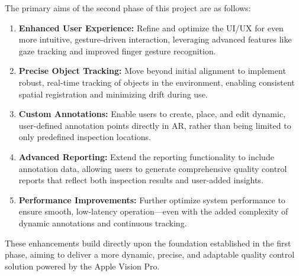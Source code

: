 The primary aims of the second phase of this project are as follows:
\begin{enumerate}
    \item \textbf{Enhanced User Experience:} Refine and optimize the UI/UX for even more intuitive, gesture-driven interaction, leveraging advanced features like gaze tracking and improved finger gesture recognition.
    \item \textbf{Precise Object Tracking:} Move beyond initial alignment to implement robust, real-time tracking of objects in the environment, enabling consistent spatial registration and minimizing drift during use.
    \item \textbf{Custom Annotations:} Enable users to create, place, and edit dynamic, user-defined annotation points directly in AR, rather than being limited to only predefined inspection locations.
    \item \textbf{Advanced Reporting:} Extend the reporting functionality to include annotation data, allowing users to generate comprehensive quality control reports that reflect both inspection results and user-added insights.
    \item \textbf{Performance Improvements:} Further optimize system performance to ensure smooth, low-latency operation—even with the added complexity of dynamic annotations and continuous tracking.
\end{enumerate}

These enhancements build directly upon the foundation established in the first phase, aiming to deliver a more dynamic, precise, and adaptable quality control solution powered by the Apple Vision Pro.